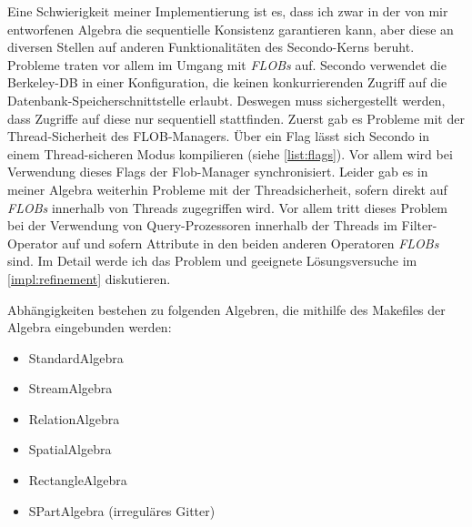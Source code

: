 \documentclass[a4paper,12pt,twoside]{article}
\newcommand{\Fb}[1]{\textit{#1}} %
\begin{document}
{Eine Schwierigkeit meiner Implementierung ist es, dass ich zwar in der von mir entworfenen Algebra die sequentielle Konsistenz garantieren kann, aber diese an diversen Stellen auf anderen Funktionalitäten des Secondo-Kerns beruht. Probleme traten vor allem im Umgang mit \Fb{FLOBs} auf. Secondo verwendet die Berkeley-DB in einer Konfiguration, die keinen konkurrierenden Zugriff auf die Datenbank-Speicherschnittstelle erlaubt. Deswegen muss sichergestellt werden, dass Zugriffe auf diese nur sequentiell stattfinden. Zuerst gab es Probleme mit der Thread-Sicherheit des FLOB-Managers. Über ein Flag lässt sich Secondo in einem Thread-sicheren Modus kompilieren (siehe \autoref{list:flags}). Vor allem wird bei Verwendung dieses Flags der Flob-Manager synchronisiert. Leider gab es in meiner Algebra weiterhin Probleme mit der Threadsicherheit, sofern direkt auf \Fb{FLOBs} innerhalb von Threads zugegriffen wird. Vor allem tritt dieses Problem bei der Verwendung von Query-Prozessoren innerhalb der Threads im Filter-Operator auf und sofern Attribute in den beiden anderen Operatoren \Fb{FLOBs} sind. Im Detail werde ich das Problem und geeignete Lösungsversuche im \autoref{impl:refinement} diskutieren.

Abhängigkeiten bestehen zu folgenden Algebren, die mithilfe des Makefiles der Algebra eingebunden werden:

\begin{itemize}
	\item StandardAlgebra
	\item StreamAlgebra
	\item RelationAlgebra
	\item SpatialAlgebra
	\item RectangleAlgebra
	\item SPartAlgebra (irreguläres Gitter)
\end{itemize}

}
\end{document}
